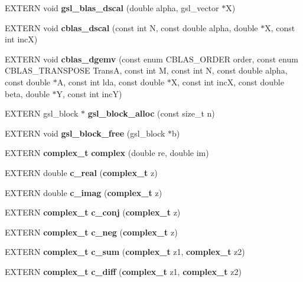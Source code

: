 \begin{CompactItemize}
\item 
EXTERN void \textbf{gsl\_\-blas\_\-dscal} (double alpha, gsl\_\-vector $\ast$X)\label{group__nr_g549aa3e6fac9f177535de54692d31df8}

\item 
EXTERN void \textbf{cblas\_\-dscal} (const int N, const double alpha, double $\ast$X, const int incX)\label{group__nr_ge13bffd83c5432842602645c03f6f26a}

\item 
EXTERN void \textbf{cblas\_\-dgemv} (const enum CBLAS\_\-ORDER order, const enum CBLAS\_\-TRANSPOSE TransA, const int M, const int N, const double alpha, const double $\ast$A, const int lda, const double $\ast$X, const int incX, const double beta, double $\ast$Y, const int incY)\label{group__nr_g71539c2ec3663bb7ec3bc88882da603a}

\item 
EXTERN gsl\_\-block $\ast$ {\bf gsl\_\-block\_\-alloc} (const size\_\-t n)
\item 
EXTERN void \textbf{gsl\_\-block\_\-free} (gsl\_\-block $\ast$b)\label{group__nr_g0952127372c14dce3c3aa65ec0ad9c1e}

\item 
EXTERN {\bf complex\_\-t} \textbf{complex} (double re, double im)\label{group__nr_g203888bac468229094352b2bb9456417}

\item 
EXTERN double \textbf{c\_\-real} ({\bf complex\_\-t} z)\label{group__nr_gbd9dcd9992cad1f6af326811da66fc9a}

\item 
EXTERN double \textbf{c\_\-imag} ({\bf complex\_\-t} z)\label{group__nr_g6adc8ee3a56fe88de97c3f40c484f824}

\item 
EXTERN {\bf complex\_\-t} \textbf{c\_\-conj} ({\bf complex\_\-t} z)\label{group__nr_g26f4378875ac801b1b5bb7a13f180f0a}

\item 
EXTERN {\bf complex\_\-t} \textbf{c\_\-neg} ({\bf complex\_\-t} z)\label{group__nr_g33f198bcc4dd193c4f8c8db9049311d2}

\item 
EXTERN {\bf complex\_\-t} \textbf{c\_\-sum} ({\bf complex\_\-t} z1, {\bf complex\_\-t} z2)\label{group__nr_g176d351f4b035de54e1fb9974c296bed}

\item 
EXTERN {\bf complex\_\-t} \textbf{c\_\-diff} ({\bf complex\_\-t} z1, {\bf complex\_\-t} z2)\label{group__nr_g5b48402b525952efb744f5b2804d1957}


\end{CompactItemize}
